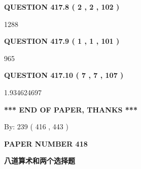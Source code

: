 \documentclass{ctexart}
\begin{document}
{\textbf{\Large{QUESTION
417.8 
 ( 2 , 2 , 102 )
}}}
  
  
 
 
\noindent{}

1288
 
 
  
\vspace{0.2in}
  
{\textbf{\Large{QUESTION
417.9 
 ( 1 , 1 , 101 )
}}}
  
  
 
 
\noindent{}

965
 
 
  
\vspace{0.2in}
  
{\textbf{\Large{QUESTION
417.10 
 ( 7 , 7 , 107 )
}}}
  
  
 
 
\noindent{}

1.934624697
 
 
   
   
 \vspace{0.2in}
 
   
   
   
   
\vspace{1.0in} 
{\textbf{\large{ *** END OF PAPER, THANKS *** }}} 
   
   
\hspace{1.0in} By: 
 239 ( 416 ,  443 )
   
   
   
   
\newpage 
\setcounter{page}{ 
   418001 } 
   
   
   
   
 {\textbf{ \Large{ PAPER NUMBER  418  }}}
   
   
\vspace{0.2in}
   
   
   
   
   
   
 \vspace{0.2in}
{\LARGE {\textbf{ 八道算术和两个选择题}}}
   
   
  
\vspace{0.2in}
  
\end{document}
